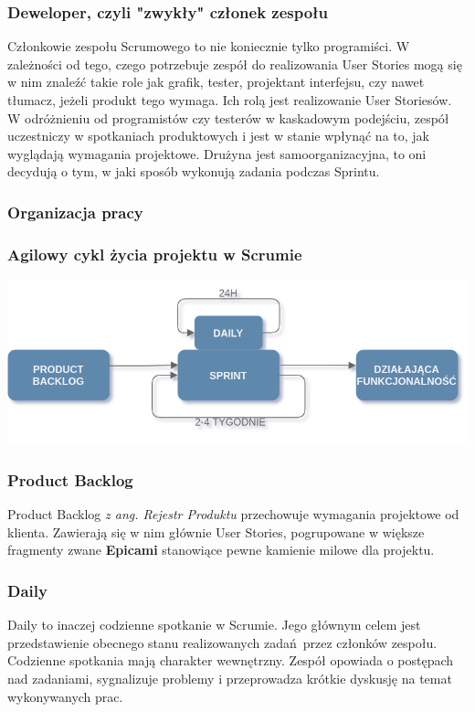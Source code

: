 \documentclass{article}
\begin{document}
\subsubsection*{Deweloper, czyli "zwykły" członek zespołu}
Członkowie zespołu Scrumowego to nie koniecznie tylko programiści. W zależności od tego, czego potrzebuje zespół do realizowania User Stories mogą się w nim znaleźć takie role jak grafik, tester, projektant interfejsu, czy nawet tłumacz, jeżeli produkt tego wymaga. Ich rolą jest realizowanie User Storiesów. W odróżnieniu od programistów czy testerów w kaskadowym podejściu, zespół uczestniczy w spotkaniach produktowych i jest w stanie wpłynąć na to, jak wyglądają wymagania projektowe. Drużyna jest samoorganizacyjna, to oni decydują o tym, w jaki sposób wykonują zadania podczas Sprintu.

\subsubsection{Organizacja pracy}

\subsubsection*{Agilowy cykl życia projektu w Scrumie}

\begin{center}
    \includegraphics[scale=0.35]{scrum.png}
\end{center}

\subsubsection*{Product Backlog}
Product Backlog \textit{z ang. Rejestr Produktu} przechowuje wymagania projektowe od klienta. Zawierają się w nim głównie User Stories, pogrupowane w większe fragmenty zwane \textbf{Epicami} stanowiące pewne kamienie milowe dla projektu.

\subsubsection*{Daily}
Daily to inaczej codzienne spotkanie w Scrumie. Jego głównym celem jest przedstawienie obecnego stanu realizowanych zadań przez członków zespołu. Codzienne spotkania mają charakter wewnętrzny. Zespół opowiada o postępach nad zadaniami, sygnalizuje problemy i przeprowadza krótkie dyskusję na temat wykonywanych prac.
\end{document}
